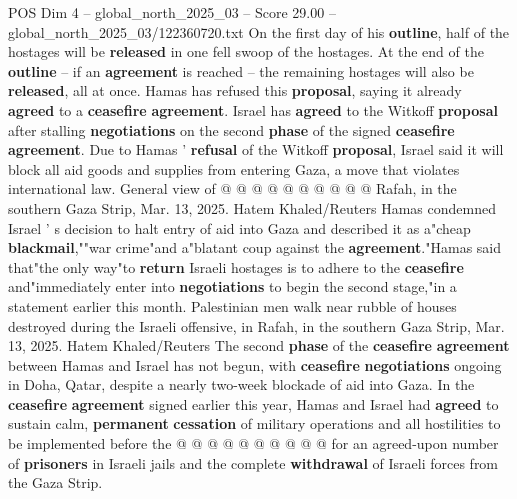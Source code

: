 \begin{textsample}{POS Dim 4 – global\_north\_2025\_03 – Score 29.00 – global\_north\_2025\_03/122360720.txt}
On the first day of his \textbf{outline}, half of the hostages will be \textbf{released} in one fell swoop of the hostages.
At the end of the \textbf{outline} -- if an \textbf{agreement} is reached -- the remaining hostages will also be \textbf{released}, all at once.
Hamas has refused this \textbf{proposal}, saying it already \textbf{agreed} to a \textbf{ceasefire} \textbf{agreement}.
Israel has \textbf{agreed} to the Witkoff \textbf{proposal} after stalling \textbf{negotiations} on the second \textbf{phase} of the signed \textbf{ceasefire} \textbf{agreement}.
Due to Hamas ' \textbf{refusal} of the Witkoff \textbf{proposal}, Israel said it will block all aid goods and supplies from entering Gaza, a move that violates international law.
General view of @ @ @ @ @ @ @ @ @ @ Rafah, in the southern Gaza Strip, Mar. 13, 2025.
Hatem Khaled/Reuters Hamas condemned Israel ' s decision to halt entry of aid into Gaza and described it as a"cheap \textbf{blackmail},""war crime"and a"blatant coup against the \textbf{agreement}."Hamas said that"the only way"to \textbf{return} Israeli hostages is to adhere to the \textbf{ceasefire} and"immediately enter into \textbf{negotiations} to begin the second stage,"in a statement earlier this month.
Palestinian men walk near rubble of houses destroyed during the Israeli offensive, in Rafah, in the southern Gaza Strip, Mar. 13, 2025.
Hatem Khaled/Reuters The second \textbf{phase} of the \textbf{ceasefire} \textbf{agreement} between Hamas and Israel has not begun, with \textbf{ceasefire} \textbf{negotiations} ongoing in Doha, Qatar, despite a nearly two-week blockade of aid into Gaza.
In the \textbf{ceasefire} \textbf{agreement} signed earlier this year, Hamas and Israel had \textbf{agreed} to sustain calm, \textbf{permanent} \textbf{cessation} of military operations and all hostilities to be implemented before the @ @ @ @ @ @ @ @ @ @ for an agreed-upon number of \textbf{prisoners} in Israeli jails and the complete \textbf{withdrawal} of Israeli forces from the Gaza Strip.

\end{textsample}
